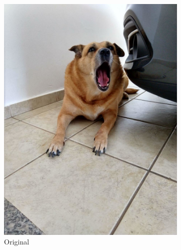 \documentclass[brazilian,a4paper,twocolumn]{article}
\begin{document}
\begin{figure}[H]
\begin{subfigure}{0.15\textwidth}
                \includegraphics[width=\textwidth,keepaspectratio]{mel}
                \caption{Original}
                \label{fig:mel-original}
            \end{subfigure}
            \begin{subfigure}{0.15\textwidth}

\end{subfigure}
\end{figure}
\end{document}

